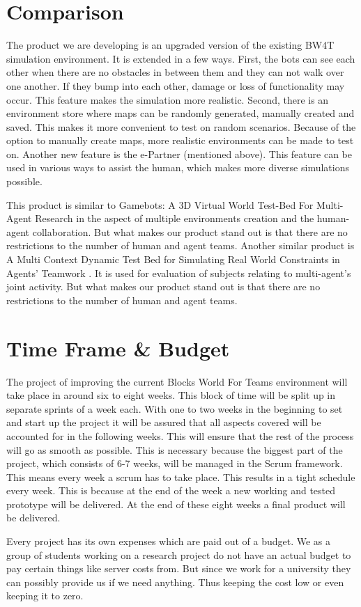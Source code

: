 \documentclass[oneside]{tudelft-report}
\begin{document}
\chapter{Comparison}
The product we are developing is an upgraded version of the existing BW4T simulation environment. It is extended in a few ways. First, the bots can see each other when there are no obstacles in between them and they can not walk over one another. If they bump into each other, damage or loss of functionality may occur. This feature makes the simulation more realistic. Second, there is an environment store where maps can be randomly generated, manually created and saved. This makes it more convenient to test on random scenarios. Because of the option to manually create maps, more realistic environments can be made to test on. Another new feature is the e-Partner (mentioned above). This feature can be used in various ways to assist the human, which makes more diverse simulations possible.

This product is similar to Gamebots: A 3D Virtual World Test-Bed For Multi-Agent Research \cite{adobbati2001gamebots} in the aspect of multiple environments creation and the human-agent collaboration. But what makes our product stand out is that there are no restrictions to the number of human and agent teams. Another similar product is A Multi Context Dynamic Test Bed for Simulating Real World Constraints in Agents' Teamwork \cite{salehi2012multi}. It is used for evaluation of subjects relating to multi-agent's joint activity. But what makes our product stand out is that there are no restrictions to the number of human and agent teams.

\chapter{Time Frame \& Budget}
The project of improving the current Blocks World For Teams environment will take place in around six to eight weeks. This block of time will be split up in separate sprints of a week each. With one to two weeks in the beginning to set and start up the project it will be assured that all aspects covered will be accounted for in the following weeks. This will ensure that the rest of the process will go as smooth as possible. This is necessary because the biggest part of the project, which consists of 6-7 weeks, will be managed in the Scrum framework. This means every week a scrum has to take place. This results in a tight schedule every week. This is because at the end of the week a new working and tested prototype will be delivered. At the end of these eight weeks a final product will be delivered.

Every project has its own expenses which are paid out of a budget. We as a group of students working on a research project do not have an actual budget to pay certain things like server costs from. But since we work for a university they can possibly provide us if we need anything. Thus keeping the cost low or even keeping it to zero.




\clearpage

\end{document}
